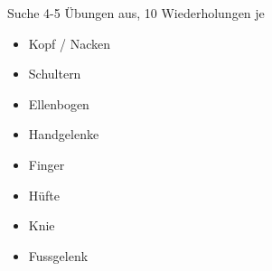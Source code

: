 Suche 4-5 Übungen aus, 10 Wiederholungen je
\begin{itemize}
    \item Kopf / Nacken
    \item Schultern
    \item Ellenbogen
    \item Handgelenke
    \item Finger
    \item Hüfte
    \item Knie
    \item Fussgelenk
\end{itemize}
